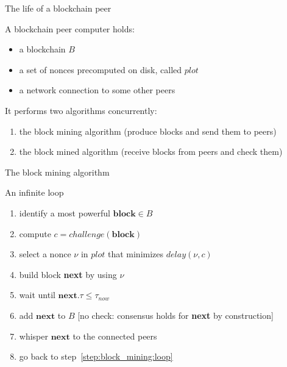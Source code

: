 \documentclass[11pt]{beamer}  %
\newcommand{\plot}{{\mathit{plot}}}
\newcommand{\challenge}{{\mathit{challenge}}}
\newcommand{\delay}{{\mathit{delay}}}
\newcommand{\now}{{\mathit{now}}}
\begin{document}
\begin{frame}{The life of a blockchain peer}

  A blockchain peer computer holds:
  \begin{itemize}
  \item a blockchain $B$
  \item a set of nonces precomputed on disk, called $\plot$
  \item a network connection to some other peers
  \end{itemize}

  \bigskip
  \pause
  It performs two algorithms concurrently:
  \begin{enumerate}
    \pause
  \item the block mining algorithm (produce blocks and send them to peers)
    \pause
  \item the block mined algorithm (receive blocks from peers and check them)
  \end{enumerate}

\end{frame}

\begin{frame}{The block mining algorithm}

  \begin{greenbox}{An infinite loop}
    \begin{enumerate}[<+->]
    \item\label{step:block_mining:loop} identify a most powerful $\mathbf{block}\in B$
    \item\label{step:block_mining:next_challenge} compute $c=\challenge(\mathbf{block})$
    \item\label{step:block_mining:next_deadline} select a nonce $\nu$ in $\plot$ that minimizes $\delay(\nu,c)$
    \item\label{step:block_mining:next_block} build block \textbf{next} by using $\nu$
    \item\label{step:block_mining:wait} wait until $\mathbf{next}.\tau\le\tau_\now$
    \item\label{step:block_mining:add} add $\mathbf{next}$ to $B$ [no check: consensus holds for \textbf{next} by construction]
    \item\label{step:block_mining:whisper} whisper $\mathbf{next}$ to the connected peers
    \item go back to step~\ref{step:block_mining:loop}
    \end{enumerate}
  \end{greenbox}

\end{frame}
\end{document}
